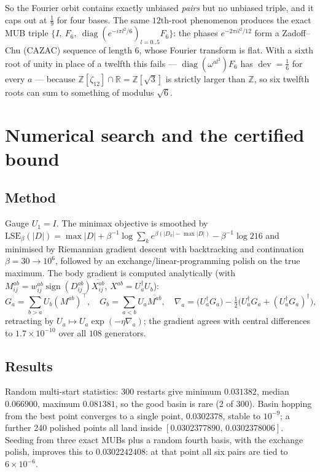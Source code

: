 \documentclass[11pt,a4paper]{article}
\theoremstyle{remark}
\newcommand{\R}{\mathbb{R}}
\newcommand{\dev}{\operatorname{dev}}
\begin{document}
So the Fourier orbit contains exactly unbiased \emph{pairs} but no unbiased triple, and it
caps out at $\tfrac19$ for four bases.  The same $12$th-root phenomenon produces the exact
MUB triple $\{I,\ F_6,\ \operatorname{diag}(e^{-i\pi l^2/6})_{l=0..5}F_6\}$: the phases
$e^{-2\pi il^2/12}$ form a Zadoff--Chu (CAZAC) sequence of length $6$, whose Fourier transform
is flat.  With a sixth root of unity in place of a twelfth this fails ---
$\operatorname{diag}(\omega^{al^2})F_6$ has $\dev=\tfrac16$ for every $a$ --- because
$\mathbb Z[\zeta_{12}]\cap\R=\mathbb Z[\sqrt3]$ is strictly larger than $\mathbb Z$, so six
twelfth roots can sum to something of modulus $\sqrt6$.

\section{Numerical search and the certified bound}
\label{sec:num}

\subsection{Method}
Gauge $U_1=I$.  The minimax objective is smoothed by
$\mathrm{LSE}_\beta(|D|)=\max|D|+\beta^{-1}\log\sum_k e^{\beta(|D_k|-\max|D|)}-\beta^{-1}\log216$
and minimised by Riemannian gradient descent with backtracking and continuation
$\beta=30\to10^{6}$, followed by an exchange/linear-programming polish on the true maximum.
The body gradient is computed analytically (with $M^{ab}_{ij}=w^{ab}_{ij}
\operatorname{sign}(D^{ab}_{ij})\overline{X^{ab}_{ij}}$, $X^{ab}=U_a^\dagger U_b$):
\[
G_a=\sum_{b>a}U_b(M^{ab})^{\!\top},\quad
G_b=\sum_{a<b}U_a\overline{M^{ab}},\quad
\nabla_a=\bigl(U_a^\dagger G_a\bigr)-\tfrac12\bigl(U_a^\dagger G_a+(U_a^\dagger G_a)^\dagger\bigr),
\]
retracting by $U_a\mapsto U_a\exp(-\eta\nabla_a)$; the gradient agrees with central
differences to $1.7\times10^{-10}$ over all $108$ generators.

\subsection{Results}
Random multi-start statistics: 300 restarts give minimum $0.031382$, median $0.066900$,
maximum $0.081381$, so the good basin is rare (2 of 300).  Basin hopping from the best point
converges to a single point, $0.0302378$, stable to $10^{-9}$; a further 240 polished points
all land inside $[0.0302377890,\,0.0302378006]$.  Seeding from three exact MUBs plus a random
fourth basis, with the exchange polish, improves this to $0.0302242408$: at that point all six
pairs are tied to $6\times10^{-6}$.
\end{document}
